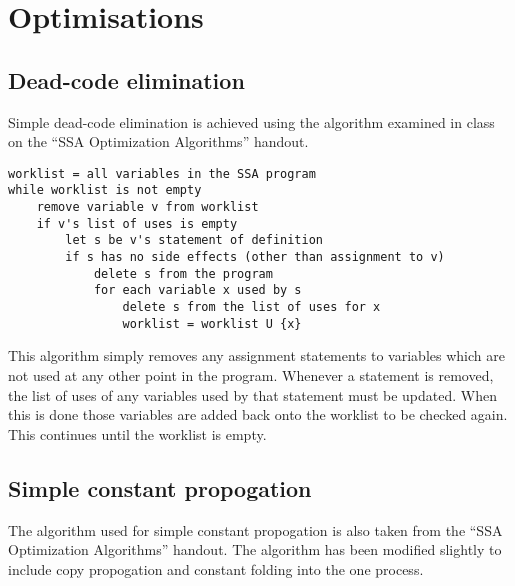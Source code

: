 \documentclass[a4paper,10pt]{report}
\begin{document}
\section{Optimisations}

\subsection{Dead-code elimination}
Simple dead-code elimination is achieved using the algorithm examined in class on the ``SSA Optimization Algorithms'' handout.

\begin{verbatim}
worklist = all variables in the SSA program
while worklist is not empty
    remove variable v from worklist
    if v's list of uses is empty
        let s be v's statement of definition
        if s has no side effects (other than assignment to v)
            delete s from the program
            for each variable x used by s
                delete s from the list of uses for x
                worklist = worklist U {x}
\end{verbatim}
This algorithm simply removes any assignment statements to variables which are not used at any other point in the program.
Whenever a statement is removed, the list of uses of any variables used by that statement must be updated. When this is done
those variables are added back onto the worklist to be checked again. This continues until the worklist is empty.

\subsection{Simple constant propogation}
The algorithm used for simple constant propogation is also taken from the ``SSA Optimization Algorithms'' handout.
The algorithm has been modified slightly to include copy propogation and constant folding into the one process.
\end{document}
